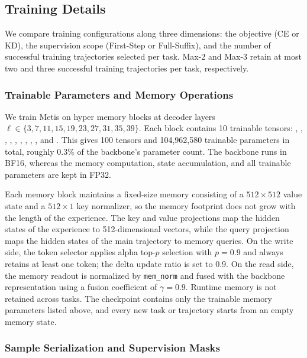 \subsection{Training Details}

We compare training configurations along three dimensions: the objective (CE or KD), the supervision scope (First-Step or Full-Suffix), and the number of successful training trajectories selected per task. Max-2 and Max-3 retain at most two and three successful training trajectories per task, respectively.

\subsubsection{Trainable Parameters and Memory Operations}

We train Metis on hyper memory blocks at decoder layers
$\ell \in \{3, 7, 11, 15, 19, 23, 27, 31, 35, 39\}$. Each block contains 10
 trainable tensors: , ,
, ,
, ,
, ,
, and . This gives 100
tensors and 104,962,580 trainable parameters in total, roughly 0.3\% of
the backbone's parameter count. The backbone runs in BF16, whereas the
memory computation, state accumulation, and all trainable
parameters are kept in FP32.

Each memory block maintains a fixed-size memory consisting of a
$512 \times 512$ value state and a $512 \times 1$ key normalizer, so the
memory footprint does not grow with the length of the experience. The key
and value projections map the hidden states of the experience to
512-dimensional vectors, while the query projection maps the hidden states
of the main trajectory to memory queries. On the write side, the token selector applies alpha top-$p$ selection with
$p = 0.9$ and always retains at least one token; the delta update ratio is
set to 0.9. On the read side, the memory readout is normalized by
\texttt{mem\_norm} and fused with the backbone representation using a
fusion coefficient of $\gamma = 0.9$. Runtime memory is not retained across tasks. The checkpoint contains only the
trainable memory parameters listed above, and every new task or
trajectory starts from an empty memory state.

\subsubsection{Sample Serialization and Supervision Masks}

